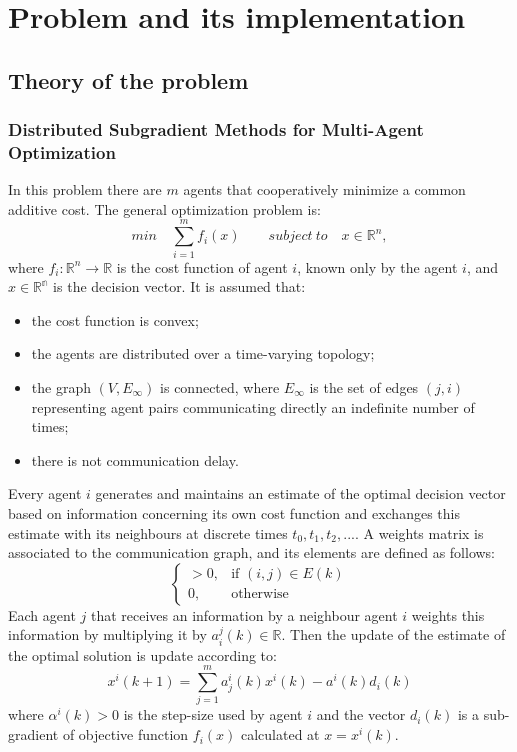 \documentclass[a4paper,11pt,oneside]{book}
\begin{document}
\chapter{Problem and its implementation} \label{Cap1}

\section{Theory of the problem} \label{Sec1.1}
\subsection {Distributed Subgradient Methods for Multi-Agent Optimization} \label{Subsec1.1.1}
In this problem there are $m$ agents that cooperatively minimize a common additive cost. The general optimization problem is:\\
\begin{equation} \label{costfunct}
min \quad \sum\limits_{i=1}^{m} f_{i} \left( x \right) \qquad subject \ to \quad x \in \mathbb{R}^n,
\end{equation}
where $f_i : \mathbb{R}^n \longrightarrow \mathbb{R}$ is the cost function of agent $i$, known only by the agent $i$, and $x \in \mathbb{R^n}$ is the decision vector. It is assumed that:
\begin{itemize} 
\item the cost function is convex;
\item the agents are distributed over a time-varying topology;
\item the graph $\left(V,E_\infty\right)$ is connected, where $E_\infty$ is the set of edges $\left(j,i\right)$ representing agent pairs communicating directly an indefinite number of times;
\item there is not communication delay.
\end{itemize} 
Every agent $i$ generates and maintains an estimate of the optimal decision vector based on information concerning its own cost function and exchanges this estimate with its neighbours at discrete times $t_0, t_1, t_2, ...$. A weights matrix is associated to the communication graph, and its elements are defined as follows:
\[
	\begin{cases}
		> 0, & \text{if } (i,j) \in E(k) \\
		0, & \text{otherwise}
	\end{cases}
\]
Each agent $j$ that receives an information by a neighbour agent $i$ weights this information by multiplying it by $a_i^j(k) \in \mathbb{R}$. Then the update of the estimate of the optimal solution is update according to:
\begin{equation} \label{update}
x^i\left(k+1\right) = \sum_{j=1}^{m}{a_j^i\left(k\right)x^i\left(k\right)-a^i\left(k\right)d_i\left(k\right)}
\end{equation}
where $\alpha^i(k)>0$ is the step-size used by agent $i$ and the vector $d_i(k)$ is a sub-gradient of objective function $f_i(x)$ calculated at $x=x^i(k)$. \cite{CITATION:1}
\end{document}
